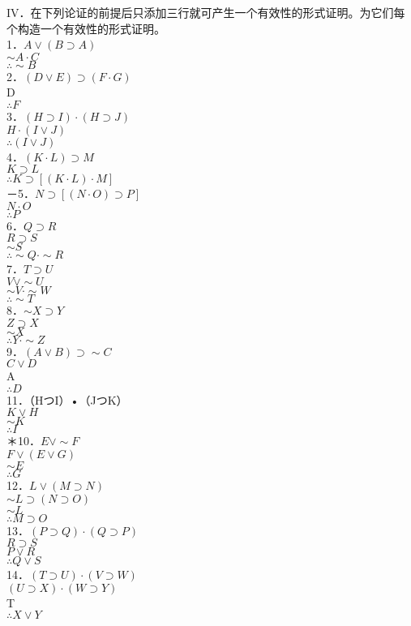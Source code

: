 IV．在下列论证的前提后只添加三行就可产生一个有效性的形式证明。为它们每个构造一个有效性的形式证明。\\
1．$A \vee(B \supset A)$\\
$\sim A \cdot C$\\
$\therefore \sim B$\\
2．$(D \vee E) \supset(F \cdot G)$\\
D\\
$\therefore F$\\
3．$(H \supset I) \cdot(H \supset J)$\\
$H \cdot(I \vee J)$\\
$\therefore(I \vee J)$\\
4．$(K \cdot L) \supset M$\\
$K \supset L$\\
$\therefore K \supset[(K \cdot L) \cdot M]$\\
－5．$N \supset[(N \cdot O) \supset P]$\\
$N \cdot O$\\
$\therefore P$\\
6．$Q \supset R$\\
$R \supset S$\\
$\sim S$\\
$\therefore \sim Q \cdot \sim R$\\
7．$T \supset U$\\
$V \vee \sim U$\\
$\sim V \cdot \sim W$\\
$\therefore \sim T$\\
8．$\sim X \supset Y$\\
$Z \supset X$\\
$\sim X$\\
$\therefore Y \cdot \sim Z$\\
9．$(A \vee B) \supset \sim C$\\
$C \vee D$\\
A\\
$\therefore D$\\
11．（HつI）•（JつK）\\
$K \vee H$\\
$\sim K$\\
$\therefore I$\\
＊10．$E \vee \sim F$\\
$F \vee(E \vee G)$\\
$\sim E$\\
$\therefore G$\\
12．$L \vee(M \supset N)$\\
$\sim L \supset(N \supset O)$\\
$\sim L$\\
$\therefore M \supset O$\\
13．$(P \supset Q) \cdot(Q \supset P)$\\
$R \supset S$\\
$P \vee R$\\
$\therefore Q \vee S$\\
14．$(T \supset U) \cdot(V \supset W)$\\
$(U \supset X) \cdot(W \supset Y)$\\
T\\
$\therefore X \vee Y$

